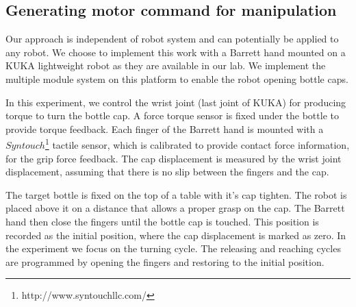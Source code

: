 

\subsection{Generating motor command for manipulation}
\label{sec:command}
Our approach is independent of robot system and can potentially be applied to any robot. We choose to implement this work with a Barrett hand mounted on a KUKA lightweight robot as they are available in our lab. We implement the multiple module system on this platform to enable the robot opening bottle caps.

In this experiment, we control the wrist joint (last joint of KUKA) for producing torque to turn the bottle cap. A force torque sensor is fixed under the bottle to provide torque feedback. Each finger of the Barrett hand is mounted with a $Syntouch$\footnote{http://www.syntouchllc.com/} tactile sensor, which is calibrated to provide contact force information, for the grip force feedback. The cap displacement is measured by the wrist joint displacement, assuming that there is no slip between the fingers and the cap.

The target bottle is fixed on the top of a table with it's cap tighten. The robot is placed above it on a distance that allows a proper grasp on the cap. The Barrett hand then close the fingers until the bottle cap is touched. This position is recorded as the initial position, where the cap displacement is marked as zero. In the experiment we focus on the turning cycle. The releasing and reaching cycles are programmed by opening the fingers and restoring to the initial position.

